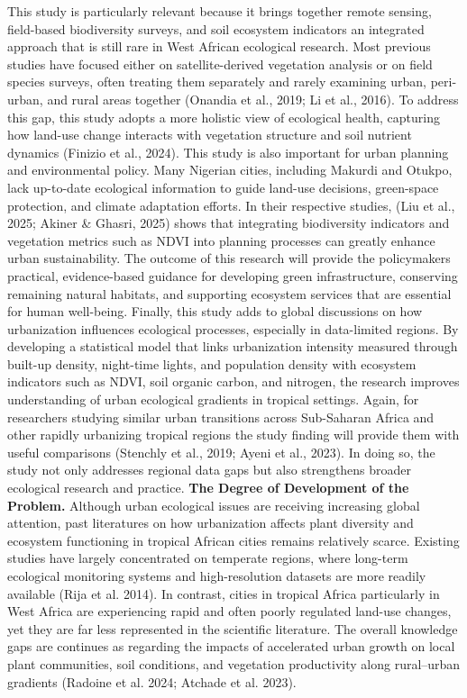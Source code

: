 This study is particularly relevant because it brings together remote sensing, field-based biodiversity surveys, and soil ecosystem indicators an integrated approach that is still rare in West African ecological research. Most previous studies have focused either on satellite-derived vegetation analysis or on field species surveys, often treating them separately and rarely examining urban, peri-urban, and rural areas together (Onandia et al., 2019; Li et al., 2016). To address this gap, this study adopts a more holistic view of ecological health, capturing how land-use change interacts with vegetation structure and soil nutrient dynamics (Finizio et al., 2024).
This study is also important for urban planning and environmental policy. Many Nigerian cities, including Makurdi and Otukpo, lack up-to-date ecological information to guide land-use decisions, green-space protection, and climate adaptation efforts. In their respective studies, (Liu et al., 2025; Akiner \& Ghasri, 2025) shows that integrating biodiversity indicators and vegetation metrics such as NDVI into planning processes can greatly enhance urban sustainability. The outcome of this research will provide the policymakers practical, evidence-based guidance for developing green infrastructure, conserving remaining natural habitats, and supporting ecosystem services that are essential for human well-being.
Finally, this study adds to global discussions on how urbanization influences ecological processes, especially in data-limited regions. By developing a statistical model that links urbanization intensity measured through built-up density, night-time lights, and population density with ecosystem indicators such as NDVI, soil organic carbon, and nitrogen, the research improves understanding of urban ecological gradients in tropical settings. Again, for researchers studying similar urban transitions across Sub-Saharan Africa and other rapidly urbanizing tropical regions the study finding will provide them with useful comparisons (Stenchly et al., 2019; Ayeni et al., 2023). In doing so, the study not only addresses regional data gaps but also strengthens broader ecological research and practice.
\textbf{The Degree of Development of the Problem.} Although urban ecological issues are receiving increasing global attention, past literatures on how urbanization affects plant diversity and ecosystem functioning in tropical African cities remains relatively scarce. Existing studies have largely concentrated on temperate regions, where long-term ecological monitoring systems and high-resolution datasets are more readily available (Rija et al. 2014). In contrast, cities in tropical Africa particularly in West Africa are experiencing rapid and often poorly regulated land-use changes, yet they are far less represented in the scientific literature. The overall knowledge gaps are continues as regarding the impacts of accelerated urban growth on local plant communities, soil conditions, and vegetation productivity along rural--urban gradients (Radoine et al. 2024; Atchade et al. 2023).
